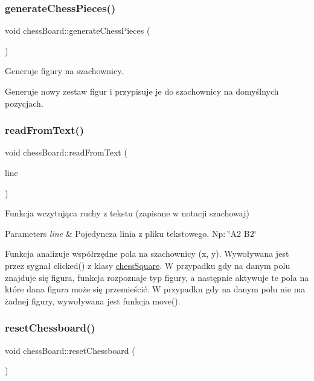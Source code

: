 \subsubsection{\texorpdfstring{generate\+Chess\+Pieces()}{generateChessPieces()}}
{\footnotesize\ttfamily void chess\+Board\+::generate\+Chess\+Pieces (\begin{DoxyParamCaption}{ }\end{DoxyParamCaption})}



Generuje figury na szachownicy. 

Generuje nowy zestaw figur i przypisuje je do szachownicy na domyślnych pozycjach. \mbox{\label{classchess_board_a43133dc6f58be4b00cc54a7ba744f69a}} 
\subsubsection{\texorpdfstring{read\+From\+Text()}{readFromText()}}
{\footnotesize\ttfamily void chess\+Board\+::read\+From\+Text (\begin{DoxyParamCaption}\item[{Q\+String}]{line }\end{DoxyParamCaption})}



Funkcja wczytująca ruchy z tekstu (zapisane w notacji szachowaj) 


\begin{DoxyParams}{Parameters}
{\em line} & Pojedyncza linia z pliku tekstowego. Np\+: \char`\"{}\+A2 B2\char`\"{}\\
\hline
\end{DoxyParams}
Funkcja analizuje współrzędne pola na szachownicy (x, y). Wywoływana jest przez sygnał clicked() z klasy \hyperlink{classchess_square}{chess\+Square}. W przypadku gdy na danym polu znajduje się figura, funkcja rozpoznaje typ figury, a następnie aktywuje te pola na które dana figura może się przemieścić. W przypadku gdy na danym polu nie ma żadnej figury, wywoływana jest funkcja move(). \mbox{\label{classchess_board_ab8a0e470df04224d40a38f99fe4232bc}} 
\subsubsection{\texorpdfstring{reset\+Chessboard()}{resetChessboard()}}
{\footnotesize\ttfamily void chess\+Board\+::reset\+Chessboard (\begin{DoxyParamCaption}{ }\end{DoxyParamCaption})}



